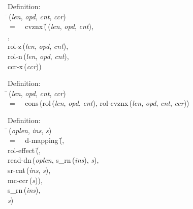 \begin{tabbing}{\sc Definition}: \\  
\=\,({\it{len\/}}, {\it{opd\/}}, {\it{cnt\/}}, {\it{ccr\/}}) \\ 
$=$$\;\;\;\;${\rm{cvznx}}\,(\=\,({\it{len\/}}, {\it{opd\/}}, {\it{cnt\/}}), \\ 
{}, \\ 
{\rm{rol-z}}\,({\it{len\/}}, {\it{opd\/}}, {\it{cnt\/}}), \\ 
{\rm{rol-n}}\,({\it{len\/}}, {\it{opd\/}}, {\it{cnt\/}}), \\ 
{\rm{ccr-x}}\,({\it{ccr\/}}))\-\-
\end{tabbing}

\begin{tabbing}{\sc Definition}: \\  
\=\,({\it{len\/}}, {\it{opd\/}}, {\it{cnt\/}}, {\it{ccr\/}}) \\ 
$=$$\;\;\;\;${\rm{cons}}\,({\rm{rol}}\,({\it{len\/}}, {\it{opd\/}}, {\it{cnt\/}}), {\rm{rol-cvznx}}\,({\it{len\/}}, {\it{opd\/}}, {\it{cnt\/}}, {\it{ccr\/}}))\-
\end{tabbing}

\begin{tabbing}{\sc Definition}: \\  
\=\,({\it{oplen\/}}, {\it{ins\/}}, {\it{s\/}}) \\ 
$=$$\;\;\;\;${\rm{d-mapping}}\,(\=, \\ 
{\rm{rol-effect}}\,(\=, \\ 
{\rm{read-dn}}\,({\it{oplen\/}}, {\rm{s\_rn}}\,({\it{ins\/}}), {\it{s\/}}), \\ 
{\rm{sr-cnt}}\,({\it{ins\/}}, {\it{s\/}}), \\ 
{\rm{mc-ccr}}\,({\it{s\/}}))\-, \\ 
{\rm{s\_rn}}\,({\it{ins\/}}), \\ 
{\it{s\/}})\-\-
\end{tabbing}

